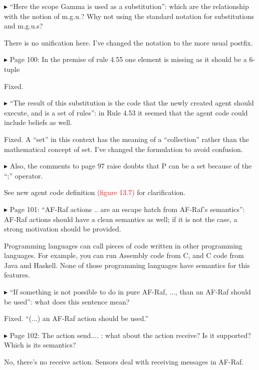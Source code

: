 \documentclass{article}
\newcommand*\R[1]{\textcolor{red}{#1}} %
\newenvironment{them}%
  {\bigskip\noindent\begingroup\color{blue}$\blacktriangleright$\enspace}%
  {\endgroup\par}
\begin{document}
\begin{them}
``Here the scope Gamma is used as a substitution'': which are the relationship
with the notion of m.g.u.? Why not using the standard notation for
substitutions and m.g.u.s?
\end{them}
There is no unification here. I've changed the notation to the more usual
postfix.

\begin{them}
Page 100:
In the premise of rule 4.55 one element is missing as it should be a 6-tuple
\end{them}
Fixed.

\begin{them}
``The result of this substitution is the code that the newly created agent
should execute, and is a set of rules'': in Rule 4.53 it seemed that the agent
code could include beliefs as well.
\end{them}
Fixed. A ``set'' in this context has the meaning of a ``collection'' rather than
the mathematical concept of set. I've changed the formulation to avoid
confusion.

\begin{them}
Also, the comments to page 97 raise doubts that P can be a set because of the
``;'' operator.
\end{them}
See new agent code definition \R{(figure 13.7)} for clarification.

\begin{them}
Page 101:
``AF-Raf actions .. are an escape hatch from AF-Raf's semantics'': AF-Raf actions
should have a clean semantics as well; if it is not the case, a strong
motivation should be provided.
\end{them}
Programming languages can call pieces of code written in other programming
languages. For example, you can run Assembly code from C, and C code from Java
and Haskell. None of those programming languages have semantics for this
features.

\begin{them}
``If something is not possible to do in pure AF-Raf, ..., than an AF-Raf should
be used'': what does this sentence mean?
\end{them}
Fixed. ``(...) an AF-Raf action should be used.''

\begin{them}
Page 102:
The action send.... : what about the action receive? Is it supported? Which is
its semantics?
\end{them}
No, there's no receive action. Sensors deal with receiving messages in AF-Raf.
\end{document}

